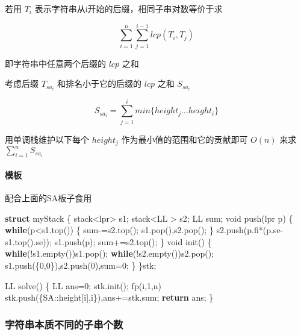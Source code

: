 \documentclass[
]{article}
\newenvironment{Shaded}{}{}
\newcommand{\ControlFlowTok}[1]{\textcolor[rgb]{0.00,0.44,0.13}{\textbf{#1}}}
\newcommand{\DataTypeTok}[1]{\textcolor[rgb]{0.56,0.13,0.00}{#1}}
\newcommand{\DecValTok}[1]{\textcolor[rgb]{0.25,0.63,0.44}{#1}}
\newcommand{\KeywordTok}[1]{\textcolor[rgb]{0.00,0.44,0.13}{\textbf{#1}}}
\newcommand{\NormalTok}[1]{#1}
\begin{document}
若用 \(T_{i}\) 表示字符串从i开始的后缀，相同子串对数等价于求

\[\sum_{i=1}^{n}\sum_{j=1}^{i-1}lcp(T_{i},T_{j})\]

即字符串中任意两个后缀的 \(lcp\) 之和

考虑后缀 \(T_{sa_{i}}\) 和排名小于它的后缀的 \(lcp\) 之和 \(S_{sa_{i}}\)

\[S_{sa_{i}}=\sum_{j=1}^{i}min\{height_{j}...height_{i}\}\]

用单调栈维护以下每个 \(height_{j}\) 作为最小值的范围和它的贡献即可
\(O(n)\) 来求 \(\sum_{i=1}^{n}S_{sa_{i}}\)

\hypertarget{ux6a21ux677f-7}{%
\paragraph{模板}\label{ux6a21ux677f-7}}

配合上面的SA板子食用

\begin{Shaded}
\begin{Highlighting}[]
\KeywordTok{struct}\NormalTok{ myStack}
\NormalTok{\{}
\NormalTok{    stack\textless{}lpr\textgreater{} s1;}
\NormalTok{    stack\textless{}LL \textgreater{} s2;}
\NormalTok{    LL sum;}
    \DataTypeTok{void}\NormalTok{ push(lpr p)}
\NormalTok{    \{}
        \ControlFlowTok{while}\NormalTok{(p\textless{}s1.top())}
\NormalTok{        \{}
\NormalTok{            sum{-}=s2.top();}
\NormalTok{            s1.pop(),s2.pop();}
\NormalTok{        \}}
\NormalTok{        s2.push(p.fi*(p.se{-}s1.top().se));}
\NormalTok{        s1.push(p);}
\NormalTok{        sum+=s2.top();}
\NormalTok{    \}}
    \DataTypeTok{void}\NormalTok{ init()}
\NormalTok{    \{}
        \ControlFlowTok{while}\NormalTok{(!s1.empty())s1.pop();}
        \ControlFlowTok{while}\NormalTok{(!s2.empty())s2.pop();}
\NormalTok{        s1.push(\{}\DecValTok{0}\NormalTok{,}\DecValTok{0}\NormalTok{\}),s2.push(}\DecValTok{0}\NormalTok{),sum=}\DecValTok{0}\NormalTok{;}
\NormalTok{    \}}
\NormalTok{\}stk;}

\NormalTok{LL solve()}
\NormalTok{\{}
\NormalTok{    LL ans=}\DecValTok{0}\NormalTok{;}
\NormalTok{    stk.init();}
\NormalTok{    fp(i,}\DecValTok{1}\NormalTok{,n) stk.push(\{SA::height[i],i\}),ans+=stk.sum;}
    \ControlFlowTok{return}\NormalTok{ ans;}
\NormalTok{\}}
\end{Highlighting}
\end{Shaded}

\hypertarget{ux5b57ux7b26ux4e32ux672cux8d28ux4e0dux540cux7684ux5b50ux4e32ux4e2aux6570}{%
\subsubsection{字符串本质不同的子串个数}\label{ux5b57ux7b26ux4e32ux672cux8d28ux4e0dux540cux7684ux5b50ux4e32ux4e2aux6570}}
\end{document}
